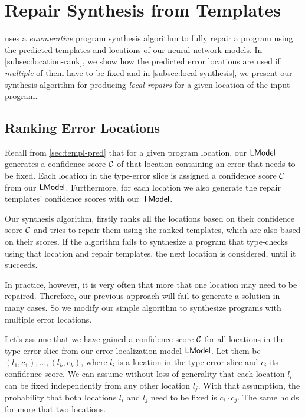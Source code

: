 \section{Repair Synthesis from Templates}
\label{sec:synthesis}
\toolname uses a \emph{enumerative} program synthesis algorithm to fully repair
a program using the predicted templates and locations of our neural network
models. In \autoref{subsec:location-rank}, we show how the predicted error
locations are used if \emph{multiple} of them have to be fixed and in
\autoref{subsec:local-synthesis}, we present our synthesis algorithm for
producing \emph{local repairs} for a given location of the input program.

\subsection{Ranking Error Locations}
\label{subsec:location-rank}

Recall from \autoref{sec:templ-pred} that for a given program location, our
$\mathsf{LModel}$ generates a confidence score $\mathcal{C}$ of that location containing an
error that needs to be fixed. Each location in the type-error slice is assigned
a confidence score $\mathcal{C}$ from our $\mathsf{LModel}$. Furthermore, for each location we
also generate the repair templates' confidence scores with our $\mathsf{TModel}$.

Our synthesis algorithm, firstly ranks all the locations based on their
confidence score $\mathcal{C}$ and tries to repair them using the ranked templates,
which are also based on their scores. If the algorithm fails to synthesize a
program that type-checks using that location and repair templates, the next
location is considered, until it succeeds.

In practice, however, it is very often that more that one location may need to
be repaired. Therefore, our previous approach will fail to generate a solution
in many cases. So we modify our simple algorithm to synthesize programs with
multiple error locations.

Let's assume that we have gained a confidence score $\mathcal{C}$ for all locations
in the type error slice from our error localization model $\mathsf{LModel}$. Let them be
$(l_1, c_1), \dots, (l_k, c_k)$, where $l_i$ is a location in the type-error
slice and $c_i$ its confidence score. We can assume without loss of generality
that each location $l_i$ can be fixed independently from any other location
$l_j$. With that assumption, the probability that both locations $l_i$ and $l_j$
need to be fixed is $c_i \cdot c_j$. The same holds for more that two locations.

